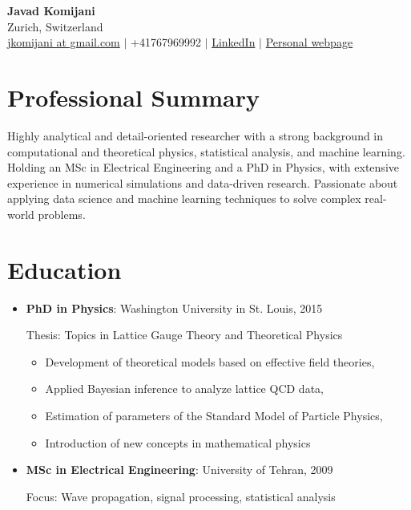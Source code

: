 \documentclass[a4paper,10pt]{article}
\begin{document}
\begin{center}
\textbf{\Large Javad Komijani} \\
Zurich, Switzerland \\
\href{mailto:jkomijani@gmail.com}{jkomijani at gmail.com}  $|$  +41767969992 $|$ \href{https://www.linkedin.com/in/javad-komijani-543a31235}{LinkedIn} $|$ \href{https://jkomijani.github.io/}{Personal webpage}
\end{center}

\section*{Professional Summary}

Highly analytical and detail-oriented researcher with a strong background in computational and theoretical physics, statistical analysis, and machine learning. Holding an MSc in Electrical Engineering and a PhD in Physics, with extensive experience in numerical simulations and data-driven research. Passionate about applying data science and machine learning techniques to solve complex real-world problems.

\section*{Education}

\begin{itemize}

\item
\textbf{PhD in Physics}:
Washington University in St. Louis, 2015

Thesis: Topics in Lattice Gauge Theory and Theoretical Physics

\begin{itemize}
\item Development of theoretical models based on effective field theories,
\item Applied Bayesian inference to analyze lattice QCD data,
\item Estimation of parameters of the Standard Model of Particle Physics,
\item Introduction of new concepts in mathematical physics
\end{itemize}

\item
\textbf{MSc in Electrical Engineering}:
University of Tehran, 2009

Focus: Wave propagation, signal processing, statistical analysis

\end{itemize}
\end{document}
